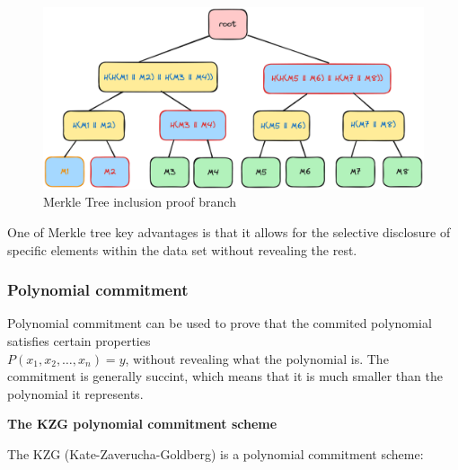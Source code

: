 \documentclass[../lecture-notes.tex]{subfiles}
\begin{document}
\begin{figure}[H]
    \centering\includegraphics[width=0.9\linewidth, clip]{images/lecture_5/MerkleTreeProof.png}

    \caption{Merkle Tree inclusion proof branch}
\end{figure}

One of Merkle tree key advantages is that it allows for the selective disclosure of specific elements within the data set without revealing the rest. 

\subsubsection{Polynomial commitment}

Polynomial commitment can be used to prove that the commited polynomial satisfies certain properties \\ $P(x_1, x_2, \ldots, x_n) = y$, without revealing what the polynomial is.
The commitment is generally succint, which means that it is much smaller than the polynomial it represents.

\textbf{The KZG polynomial commitment scheme}

The KZG (Kate-Zaverucha-Goldberg) is a polynomial commitment scheme:
\end{document}

